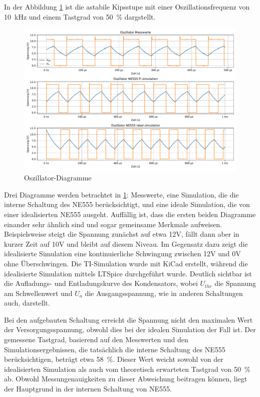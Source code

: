 In der Abbildung \ref{fig:oszillator} ist die astabile Kipsstupe mit einer Oszillationsfrequenz von \SI{10}{\kilo\hertz} und einem Tastgrad von \SI{50}{\percent} dargstellt.
\begin{figure}[H]
  \centering
  \includegraphics[width=\textwidth]{Elektronik-Laborprotokoll_Filter/Plots/oszillator.pdf}
  \caption{Oszillator-Diagramme}
  \label{fig:oszillator}
\end{figure}
Drei Diagramme werden betrachtet in \ref{fig:oszillator}: Messwerte, eine Simulation, die die interne Schaltung des NE555 berücksichtigt, und eine ideale Simulation, die von einer idealisierten NE555 ausgeht. Auffällig ist, dass die ersten beiden Diagramme einander sehr ähnlich sind und sogar gemeinsame Merkmale aufweisen. Beispielsweise steigt die Spannung zunächst auf etwa 12V, fällt dann aber in kurzer Zeit auf 10V und bleibt auf diesem Niveau. Im Gegensatz dazu zeigt die idealisierte Simulation eine kontinuierliche Schwingung zwischen 12V und 0V ohne Überschwingen. Die TI-Simulation wurde mit KiCad erstellt, während die idealisierte Simulation mittels LTSpice durchgeführt wurde. Deutlich sichtbar ist die Aufladungs- und Entladungskurve des Kondensators, wobei $U_{thr}$ die Spannung am Schwellenwert und $U_{a}$ die Ausgangsspannung, wie in anderen Schaltungen auch, darstellt.

Bei den aufgebauten Schaltung erreicht die Spannung nicht den maximalen Wert der Versorgungsspannung, obwohl dies bei der idealen Simulation der Fall ist.
Der gemessene Tastgrad, basierend auf den Messwerten und den Simulationsergebnissen, die tatsächlich die interne Schaltung des NE555 berücksichtigen, beträgt etwa \SI{58}{\percent}. Dieser Wert weicht sowohl von der idealisierten Simulation als auch vom theoretisch erwarteten Tastgrad von \SI{50}{\percent} ab. Obwohl Messungenauigkeiten zu dieser Abweichung beitragen können, liegt der Hauptgrund in der internen Schaltung von NE555.\\

